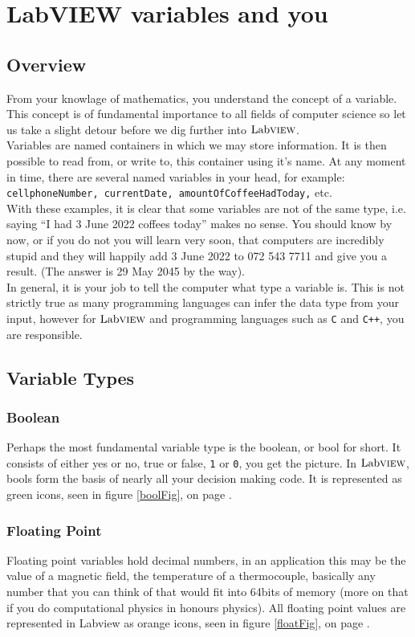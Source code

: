 	\section{LabVIEW variables and you}
	\subsection{Overview}
	From your knowlage of mathematics, you understand the concept of a variable. This concept is of fundamental importance to all fields of computer science so let us take a slight detour before we dig further into $\text{Lab}\textsc{view}$.\\
	
	Variables are named containers in which we may store information. It is then possible to read from, or write to, this container using it's name. At any moment in time, there are several named variables in your head, for example: \texttt{cellphoneNumber, currentDate, amountOfCoffeeHadToday,} etc.\\
	
	With these examples, it is clear that some variables are not of the same type, i.e. saying ``I had 3 June 2022 coffees today'' makes no sense. You should know by now, or if you do not you will learn very soon, that computers are incredibly stupid and they will happily add 3 June 2022 to 072 543 7711 and give you a result. (The answer is 29 May 2045 by the way).\\
	
	In general, it is your job to tell the computer what type a variable is. This is not strictly true as many programming languages can infer the data type from your input, however for $\text{Lab}\textsc{view}$ and programming languages such as \texttt{C} and \texttt{C++}, you are responsible.
	
	\subsection{Variable Types}
	\subsubsection{Boolean}
	Perhaps the most fundamental variable type is the boolean, or bool for short. It consists of either yes or no, true or false, \texttt{1} or \texttt{0}, you get the picture. In $\text{Lab}\textsc{view}$, bools form the basis of nearly all your decision making code. It is represented as green icons, seen in figure \ref{boolFig}, on page \pageref{boolFig}.
	\subsubsection{Floating Point}
	Floating point variables hold decimal numbers, in an application this may be the value of a magnetic field, the temperature of a thermocouple, basically any number that you can think of that would fit into 64bits of memory (more on that if you do computational physics in honours physics). All floating point values are represented in Labview as orange icons, seen in figure \ref{floatFig}, on page \pageref{floatFig}.
